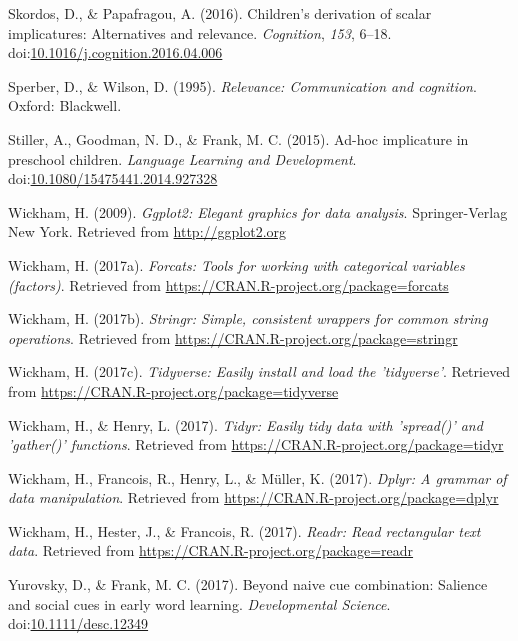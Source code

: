 \documentclass[mask,man]{apa6}
\theoremstyle{definition}
\theoremstyle{definition}
\theoremstyle{definition}
\theoremstyle{remark}
\begin{document}
\hypertarget{ref-skordos2016}{}
Skordos, D., \& Papafragou, A. (2016). Children's derivation of scalar
implicatures: Alternatives and relevance. \emph{Cognition}, \emph{153},
6--18.
doi:\href{https://doi.org/10.1016/j.cognition.2016.04.006}{10.1016/j.cognition.2016.04.006}

\hypertarget{ref-sperber1986}{}
Sperber, D., \& Wilson, D. (1995). \emph{Relevance: Communication and
cognition}. Oxford: Blackwell.

\hypertarget{ref-stiller2015}{}
Stiller, A., Goodman, N. D., \& Frank, M. C. (2015). Ad-hoc implicature
in preschool children. \emph{Language Learning and Development}.
doi:\href{https://doi.org/10.1080/15475441.2014.927328}{10.1080/15475441.2014.927328}

\hypertarget{ref-R-ggplot2}{}
Wickham, H. (2009). \emph{Ggplot2: Elegant graphics for data analysis}.
Springer-Verlag New York. Retrieved from \url{http://ggplot2.org}

\hypertarget{ref-R-forcats}{}
Wickham, H. (2017a). \emph{Forcats: Tools for working with categorical
variables (factors)}. Retrieved from
\url{https://CRAN.R-project.org/package=forcats}

\hypertarget{ref-R-stringr}{}
Wickham, H. (2017b). \emph{Stringr: Simple, consistent wrappers for
common string operations}. Retrieved from
\url{https://CRAN.R-project.org/package=stringr}

\hypertarget{ref-R-tidyverse}{}
Wickham, H. (2017c). \emph{Tidyverse: Easily install and load the
'tidyverse'}. Retrieved from
\url{https://CRAN.R-project.org/package=tidyverse}

\hypertarget{ref-R-tidyr}{}
Wickham, H., \& Henry, L. (2017). \emph{Tidyr: Easily tidy data with
'spread()' and 'gather()' functions}. Retrieved from
\url{https://CRAN.R-project.org/package=tidyr}

\hypertarget{ref-R-dplyr}{}
Wickham, H., Francois, R., Henry, L., \& Müller, K. (2017). \emph{Dplyr:
A grammar of data manipulation}. Retrieved from
\url{https://CRAN.R-project.org/package=dplyr}

\hypertarget{ref-R-readr}{}
Wickham, H., Hester, J., \& Francois, R. (2017). \emph{Readr: Read
rectangular text data}. Retrieved from
\url{https://CRAN.R-project.org/package=readr}

\hypertarget{ref-yurovsky2017}{}
Yurovsky, D., \& Frank, M. C. (2017). Beyond naive cue combination:
Salience and social cues in early word learning. \emph{Developmental
Science}.
doi:\href{https://doi.org/10.1111/desc.12349}{10.1111/desc.12349}
\end{document}
